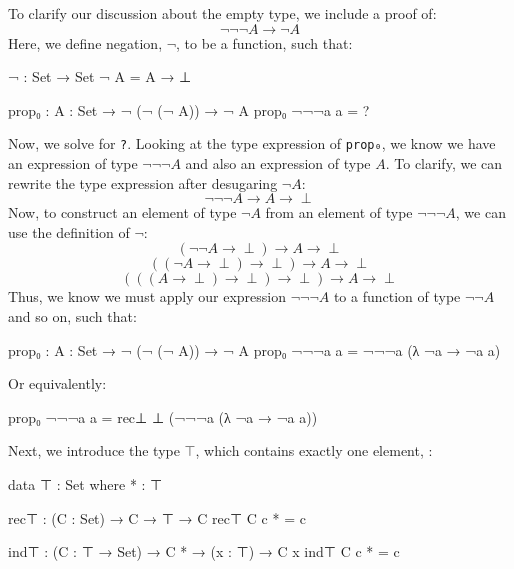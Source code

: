 \documentclass[12pt]{article}
\begin{document}
To clarify our discussion about the empty type, we include a proof of:
$$\neg\neg\neg A\rightarrow\neg A$$
Here, we define negation, \(\neg\), to be a function, such that:
\begin{center}
\begin{minipage}{0.9\textwidth}
\begin{code}
¬ : Set → Set
¬ A = A → ⊥

prop₀ : {A : Set} → ¬ (¬ (¬ A)) → ¬ A
prop₀ ¬¬¬a a = ?
\end{code}
\end{minipage}
\end{center}
Now, we solve for {\tt ?}. Looking at the type expression of {\tt prop₀},
we know we have an expression of type \(\neg\neg\neg A\) and also an
expression of type \(A\). To clarify, we can rewrite the type expression
after desugaring \(\neg A\):
$$\neg\neg\neg A\rightarrow A\rightarrow\perp$$
Now, to construct an element of type \(\neg A\) from an element of type
\(\neg\neg\neg A\), we can use the definition of \(\neg\):
$$(\neg\neg A\rightarrow\perp)\rightarrow A\rightarrow\perp$$
$$((\neg A\rightarrow\perp)\rightarrow\perp)\rightarrow A\rightarrow\perp$$
$$(((A\rightarrow\perp)\rightarrow\perp)\rightarrow\perp)\rightarrow A\rightarrow\perp$$
Thus, we know we must apply our expression \(\neg\neg\neg A\) to a function
of type \(\neg\neg A\) and so on, such that:
\begin{center}
\begin{minipage}{0.9\textwidth}
\begin{code}
prop₀ : {A : Set} → ¬ (¬ (¬ A)) → ¬ A
prop₀ ¬¬¬a a = ¬¬¬a (λ ¬a → ¬a a)
\end{code}
\end{minipage}
\end{center}
Or equivalently:
\begin{center}
\begin{minipage}{0.9\textwidth}
\begin{code}
prop₀ ¬¬¬a a = rec⊥ ⊥ (¬¬¬a (λ ¬a → ¬a a))
\end{code}
\end{minipage}
\end{center}
Next, we introduce the type \(\top\), which contains exactly one element,
{\tt *}:
\begin{center}
\begin{minipage}{0.9\textwidth}
\begin{code}
data ⊤ : Set where
  * : ⊤

rec⊤ : (C : Set) → C → ⊤ → C
rec⊤ C c * = c

ind⊤ : (C : ⊤ → Set) → C * → (x : ⊤) → C x
ind⊤ C c * = c
\end{code}
\end{minipage}
\end{center}
\end{document}
